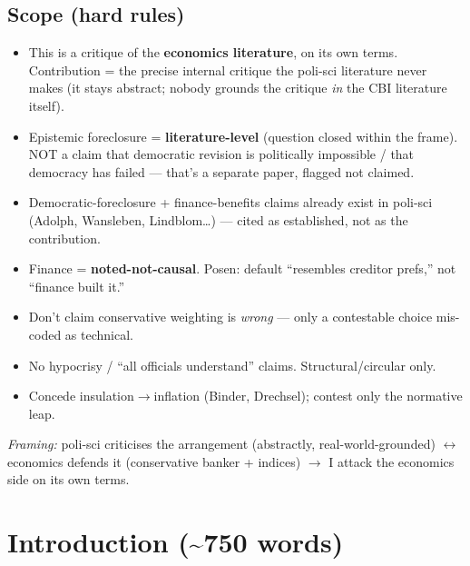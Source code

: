 \documentclass[12pt,a4paper]{article}
\begin{document}
\begin{doublespace}
\subsection*{Scope (hard rules)}
\begin{itemize}
    \item This is a critique of the \textbf{economics literature}, on its own terms. Contribution = the precise internal critique the poli-sci literature never makes (it stays abstract; nobody grounds the critique \textit{in} the CBI literature itself).
    \item Epistemic foreclosure = \textbf{literature-level} (question closed within the frame). NOT a claim that democratic revision is politically impossible / that democracy has failed --- that's a separate paper, flagged not claimed.
    \item Democratic-foreclosure + finance-benefits claims already exist in poli-sci (Adolph, Wansleben, Lindblom\ldots) --- cited as established, not as the contribution.
    \item Finance = \textbf{noted-not-causal}. Posen: default ``resembles creditor prefs,'' not ``finance built it.''
    \item Don't claim conservative weighting is \textit{wrong} --- only a contestable choice mis-coded as technical.
    \item No hypocrisy / ``all officials understand'' claims. Structural/circular only.
    \item Concede insulation$\rightarrow$inflation (Binder, Drechsel); contest only the normative leap.
\end{itemize}

\textit{Framing:} poli-sci criticises the arrangement (abstractly, real-world-grounded) $\leftrightarrow$ economics defends it (conservative banker + indices) $\rightarrow$ I attack the economics side on its own terms.

\newpage

\tableofcontents
\newpage

\section{Introduction (\textasciitilde750 words)}


\end{doublespace}
\end{document}
